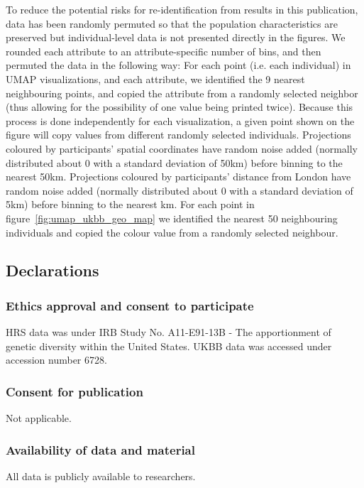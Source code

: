 \documentclass[12pt]{pnas-new}
\begin{document}
{To reduce the potential risks for re-identification from results in this publication, data has been randomly permuted so that the population characteristics are preserved but individual-level data is not presented directly in the figures. We rounded each attribute to an attribute-specific number of bins, and then permuted the data in the following way: 
For each point (i.e. each individual) in UMAP visualizations, and each attribute, we identified the 9 nearest neighbouring points, and copied the attribute from a randomly selected neighbor (thus allowing for the possibility of one value being printed twice).  Because this process is done independently for each visualization, a given point shown on the figure will copy values from different randomly selected individuals. Projections coloured by participants' spatial coordinates have random noise added (normally distributed about 0 with a standard deviation of 50km) before binning to the nearest 50km. Projections coloured by participants' distance from London have random noise added (normally distributed about 0 with a standard deviation of 5km) before binning to the nearest km. For each point in figure~\ref{fig:umap_ukbb_geo_map} we identified the nearest 50 neighbouring individuals and copied the colour value from a randomly selected neighbour.}

\showmatmethods{} %



\subsection*{Declarations}
\subsubsection*{Ethics approval and consent to participate}
HRS data was under IRB Study No. A11-E91-13B - The apportionment of genetic diversity within the United States. UKBB data was accessed under accession number 6728.

\subsubsection*{Consent for publication} Not applicable.

\subsubsection*{Availability of data and material} All data is publicly available to researchers.
\end{document}
